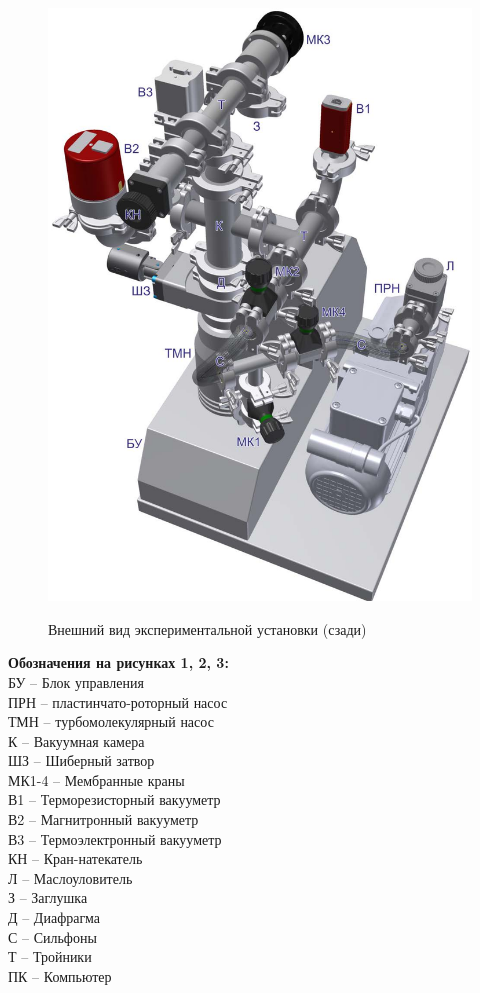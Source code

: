 \documentclass[a4paper,12pt]{article}
\begin{document}
\begin{figure}[h]
\begin{center}
\begin{minipage}[h]{0.45\linewidth}
	\includegraphics[width=1\linewidth]{fig2.jpg}
	\label{back}
	\caption{Внешний вид экспериментальной установки (сзади)}
\end{minipage}
\end{center}
\end{figure}

\noindent \textbf{Обозначения на рисунках 1, 2, 3:}\\
БУ -- Блок управления \\
ПРН -- пластинчато-роторный насос  \\
ТМН -- турбомолекулярный насос \\
К -- Вакуумная камера \\
ШЗ -- Шиберный затвор \\
МК1-4 -- Мембранные краны \\
В1 -- Терморезисторный вакууметр \\
В2 -- Магнитронный вакууметр \\
В3 -- Термоэлектронный вакууметр \\
КН -- Кран-натекатель \\
Л -- Маслоуловитель \\
З -- Заглушка \\
Д -- Диафрагма \\
С -- Сильфоны \\
Т -- Тройники \\
ПК -- Компьютер \\
\end{document}
